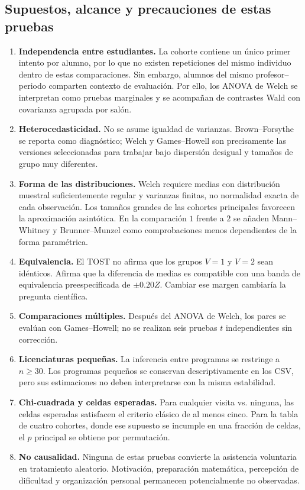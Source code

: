 \subsection{Supuestos, alcance y precauciones de estas pruebas}

\begin{enumerate}[label=\arabic*.]
\item \textbf{Independencia entre estudiantes.} La cohorte contiene un único primer intento por alumno, por lo que no existen repeticiones del mismo individuo dentro de estas comparaciones. Sin embargo, alumnos del mismo profesor--periodo comparten contexto de evaluación. Por ello, los ANOVA de Welch se interpretan como pruebas marginales y se acompañan de contrastes Wald con covarianza agrupada por salón.
\item \textbf{Heterocedasticidad.} No se asume igualdad de varianzas. Brown--Forsythe se reporta como diagnóstico; Welch y Games--Howell son precisamente las versiones seleccionadas para trabajar bajo dispersión desigual y tamaños de grupo muy diferentes.
\item \textbf{Forma de las distribuciones.} Welch requiere medias con distribución muestral suficientemente regular y varianzas finitas, no normalidad exacta de cada observación. Los tamaños grandes de las cohortes principales favorecen la aproximación asintótica. En la comparación $1$ frente a $2$ se añaden Mann--Whitney y Brunner--Munzel como comprobaciones menos dependientes de la forma paramétrica.
\item \textbf{Equivalencia.} El TOST no afirma que los grupos $V=1$ y $V=2$ sean idénticos. Afirma que la diferencia de medias es compatible con una banda de equivalencia preespecificada de $\pm0.20Z$. Cambiar ese margen cambiaría la pregunta científica.
\item \textbf{Comparaciones múltiples.} Después del ANOVA de Welch, los pares se evalúan con Games--Howell; no se realizan seis pruebas $t$ independientes sin corrección.
\item \textbf{Licenciaturas pequeñas.} La inferencia entre programas se restringe a $n\geq30$. Los programas pequeños se conservan descriptivamente en los CSV, pero sus estimaciones no deben interpretarse con la misma estabilidad.
\item \textbf{Chi-cuadrada y celdas esperadas.} Para cualquier visita vs. ninguna, las celdas esperadas satisfacen el criterio clásico de al menos cinco. Para la tabla de cuatro cohortes, donde ese supuesto se incumple en una fracción de celdas, el $p$ principal se obtiene por permutación.
\item \textbf{No causalidad.} Ninguna de estas pruebas convierte la asistencia voluntaria en tratamiento aleatorio. Motivación, preparación matemática, percepción de dificultad y organización personal permanecen potencialmente no observadas.
\end{enumerate}


